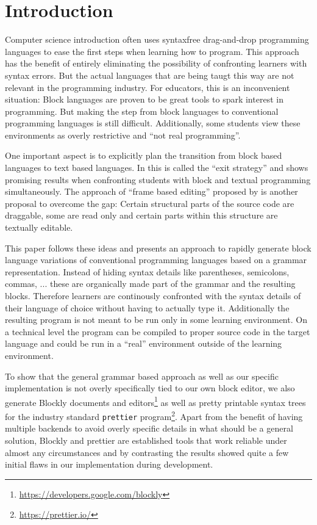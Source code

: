 \documentclass[sigconf,natbib=false,review=true,anonymous]{acmart}
\begin{document}
\section{Introduction}

Computer science introduction often uses syntaxfree drag-and-drop programming languages to ease the first steps when learning how to program. This approach has the benefit of entirely eliminating the possibility of confronting learners with syntax errors. But the actual languages that are being taugt this way are not relevant in the programming industry. For educators, this is an inconvenient situation: Block languages are proven to be great tools to spark interest in programming. But making the step from block languages to conventional programming languages is still difficult. Additionally, some students view these environments as overly restrictive and \enquote{not real programming}\cite{braune_learning_2020}.

One important aspect is to explicitly plan the transition from block based languages to text based languages. In \cite{fraser_ten_2015} this is called the \enquote{exit strategy} and \cite{alrubaye_comparison_2019} shows promising results when confronting students with block and textual programming simultaneously. The approach of \enquote{frame based editing} proposed by \cite{kolling_frame-based_2015} is another proposal to overcome the gap: Certain structural parts of the source code are draggable, some are read only and certain parts within this structure are textually editable.

This paper follows these ideas and presents an approach to rapidly generate block language variations of conventional programming languages based on a grammar representation. Instead of hiding syntax details like parentheses, semicolons, commas, ... these are organically made part of the grammar and the resulting blocks. Therefore learners are continously confronted with the syntax details of their language of choice without having to actually type it. Additionally the resulting program is not meant to be run only in some learning environment. On a technical level the program can be compiled to proper source code in the target language and could be run in a \enquote{real} environment outside of the learning environment.

To show that the general grammar based approach as well as our specific implementation is not overly specifically tied to our own block editor, we also generate Blockly documents and editors\footnote{\url{https://developers.google.com/blockly}} as well as pretty printable syntax trees for the industry standard \texttt{prettier} program\footnote{\url{https://prettier.io/}}. Apart from the benefit of having multiple backends to avoid overly specific details in what should be a general solution, Blockly and prettier are established tools that work reliable under almost any circumstances and by contrasting the results showed quite a few initial flaws in our implementation during development.
\end{document}
